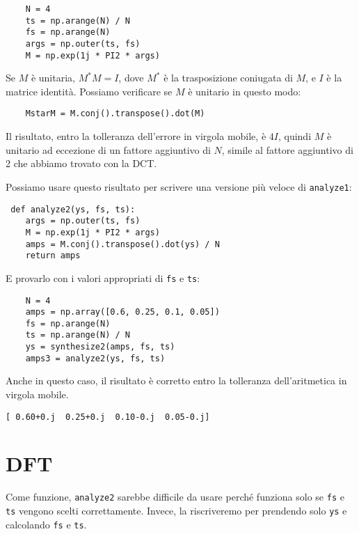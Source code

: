 \documentclass[12pt]{book} \usepackage[width=5.5in,height=8.5in, hmarginratio=3:2,vmarginratio=1:1]{geometry}
\begin{document}
\begin{verbatim} 
    N = 4
    ts = np.arange(N) / N
    fs = np.arange(N)
    args = np.outer(ts, fs)
    M = np.exp(1j * PI2 * args)
 \end{verbatim} 

Se $M$ è unitaria, $M^*M = I$, dove $M^*$ è la trasposizione coniugata di $M$, e $I$ è la matrice identità. Possiamo verificare se $M$ è unitario in questo modo:

\begin{verbatim} 
    MstarM = M.conj().transpose().dot(M)
 \end{verbatim} 

Il risultato, entro la tolleranza dell'errore in virgola mobile, è $4 I$, quindi $M$ è unitario ad eccezione di un fattore aggiuntivo di $N$, simile al fattore aggiuntivo di 2 che abbiamo trovato con la DCT.

Possiamo usare questo risultato per scrivere una versione più veloce di {\tt analyze1}:

\begin{verbatim} def analyze2(ys, fs, ts):
    args = np.outer(ts, fs)
    M = np.exp(1j * PI2 * args)
    amps = M.conj().transpose().dot(ys) / N
    return amps
 \end{verbatim} 

E provarlo con i valori appropriati di {\tt fs} e {\tt ts}:

\begin{verbatim} 
    N = 4
    amps = np.array([0.6, 0.25, 0.1, 0.05])
    fs = np.arange(N)
    ts = np.arange(N) / N
    ys = synthesize2(amps, fs, ts)
    amps3 = analyze2(ys, fs, ts)
 \end{verbatim} 

Anche in questo caso, il risultato è corretto entro la tolleranza dell'aritmetica in virgola mobile.

\begin{verbatim} 
[ 0.60+0.j  0.25+0.j  0.10-0.j  0.05-0.j]
 \end{verbatim} 

\section{DFT} \label{dftsection} 

Come funzione, {\tt analyze2} sarebbe difficile da usare perché funziona solo se {\tt fs} e {\tt ts} vengono scelti correttamente. Invece, la riscriveremo per prendendo solo {\tt ys} e calcolando {\tt fs} e {\tt ts}.
\end{document}
